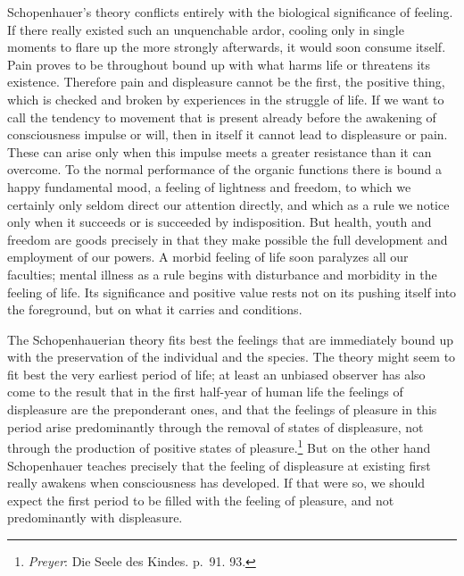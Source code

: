 \documentclass[12pt,a4paper]{book}
\newcommand{\opage}[1]{\marginnote{\footnotesize\textit{[#1]}}}
\begin{document}
Schopenhauer's theory conflicts entirely with the biological
significance of feeling. If there really existed such an unquenchable
ardor, cooling only in single moments to flare up the more strongly
afterwards, it would soon consume itself. Pain proves to be throughout
bound up with what harms life or threatens its existence. Therefore pain
and displeasure cannot be the first, the positive thing, which is
checked and broken by experiences in the struggle of life. If we want to
call the tendency to movement that is present already before the
awakening of consciousness impulse or will, then in itself it cannot
lead to displeasure or pain. These can arise only when this impulse
meets a greater resistance than it can overcome. To the normal
performance of the organic functions there is bound a happy fundamental
mood, a feeling of lightness and freedom, to which we certainly only
seldom direct our attention directly, and which as a rule we notice only
when it succeeds or is succeeded by indisposition. But health, youth and
freedom are goods precisely in that they make possible the full
development and employment of our powers. A morbid feeling of life soon
paralyzes all our faculties; mental illness as a rule begins with
disturbance and morbidity in the feeling of life. Its significance and
positive value rests not on its pushing itself into the foreground, but
on what it carries and conditions.

The Schopenhauerian theory fits best the feelings that are immediately
bound up with the preservation of the individual and the species. The
theory might seem to fit best the very earliest period of life; at
least an unbiased observer has also come to the result that in the first
half-year of human life the feelings of displeasure are the
preponderant ones, and that the feelings of pleasure in this period
arise predominantly through the removal of states of displeasure, not
through the production of positive states of
pleasure.\footnote{\emph{Preyer}: Die Seele des Kindes. p.~91. 93.}
But on the other hand Schopenhauer teaches precisely that the feeling of
displeasure
\opage{338}at existing first really awakens when consciousness has
developed. If that were so, we should expect the first period to be
filled with the feeling of pleasure, and not predominantly with
displeasure.
\end{document}
